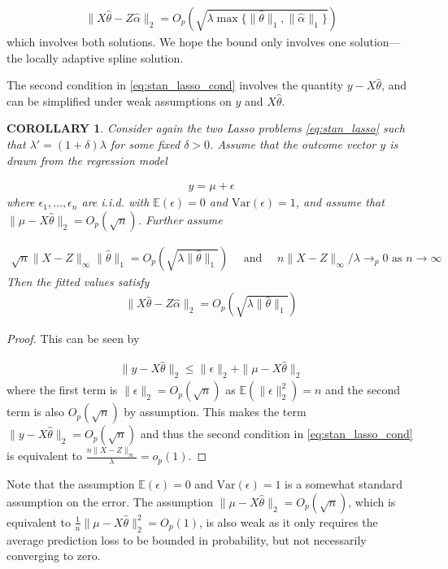 \documentclass[a4paper]{article}
\newtheorem{corollary}{COROLLARY}
\newcommand{\E}{\mathbb{E}}
\begin{document}
\begin{align*}
\|X\hat{\theta} - Z\hat{\alpha}\|_2 = O_p(\sqrt{\lambda\max\{\|\hat{\theta}\|_1, \|\hat{\alpha}\|_1\}})
\end{align*}
which involves both solutions. We hope the bound only involves one solution---the locally adaptive spline solution.

The second condition in \eqref{eq:stan_lasso_cond} involves the quantity $y-X\hat{\theta}$, and can be simplified under weak assumptions on $y$ and $X\hat{\theta}$. 

\begin{corollary}
Consider again the two Lasso problems \eqref{eq:stan_lasso} such that $\lambda' = (1+\delta)\lambda$ for some fixed $\delta > 0$. Assume that the outcome vector $y$ is drawn from the regression model 

\begin{align*}
y = \mu + \epsilon
\end{align*}
where $\epsilon_1,\ldots,\epsilon_n$ are i.i.d. with $\E(\epsilon) = 0$ and $\mbox{Var}(\epsilon) = 1$, and assume that $\|\mu-X\hat{\theta}\|_2 = O_p(\sqrt{n})$. Further assume 

\begin{align*}
\sqrt{n}\|X-Z\|_\infty\|\hat{\theta}\|_1 = O_p(\sqrt{\lambda\|\hat{\theta}\|_1}) \quad \text{ and } \quad n\|X-Z\|_\infty/\lambda \rightarrow_p 0 \text{ as } n\rightarrow \infty
\end{align*}
Then the fitted values satisfy
\begin{align*}
\|X\hat{\theta} - Z\hat{\alpha}\|_2 = O_p(\sqrt{\lambda\|\hat{\theta}\|_1})
\end{align*}
\label{cor:corollary_1}
\end{corollary}
\begin{proof}
This can be seen by 

\begin{align*}
\|y-X\hat{\theta}\|_2 \leq \|\epsilon\|_2 + \|\mu - X\hat{\theta}\|_2
\end{align*}
where the first term is $\|\epsilon\|_2 = O_p(\sqrt{n})$ as $\E(\|\epsilon\|_2^2) = n$ and the second term is also $O_p(\sqrt{n})$ by assumption. This makes the term $\|y-X\hat{\theta}\|_2 = O_p(\sqrt{n})$ and thus the second condition in \eqref{eq:stan_lasso_cond} is equivalent to $\frac{n\|X-Z\|_\infty}{\lambda} = o_p(1)$. 
\end{proof}

Note that the assumption $\E(\epsilon) = 0$ and $\mbox{Var}(\epsilon) = 1$ is a somewhat standard assumption on the error. The assumption $\|\mu - X\hat{\theta}\|_2 = O_p(\sqrt{n})$, which is equivalent to $\frac{1}{n}\|\mu-X\hat{\theta}\|_2^2 = O_p(1)$, is also weak as it only requires the average prediction loss to be bounded in probability, but not necessarily converging to zero.
\end{document}
